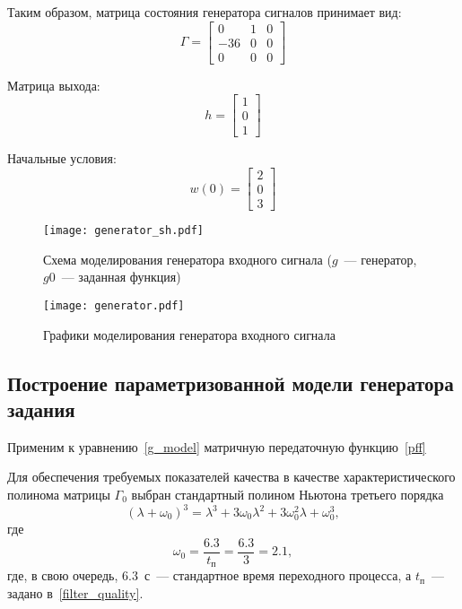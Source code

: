 Таким образом, матрица состояния генератора сигналов принимает вид:
\begin{equation}
	\Gamma = 
	\begin{bmatrix}
		0 & 1 & 0 \\
		-36 & 0 & 0 \\
		0 & 0 & 0
	\end{bmatrix}
\end{equation}

Матрица выхода:
\begin{equation}
	h = 
	\begin{bmatrix}
		1\\ 
		0\\
		1
	\end{bmatrix}
\end{equation}

Начальные условия:
\begin{equation}
	w(0) = 
	\begin{bmatrix}
		2\\
		0\\
		3
	\end{bmatrix}
\end{equation}

\begin{figure}[h!]
	\centering
	\texttt{[image: generator\_sh.pdf]}
	\caption{Схема моделирования генератора входного сигнала ($g$~--- генератор, $g0$~--- заданная функция)}
	\label{fg:generator_sh}
\end{figure}

\begin{figure}[h!]
	\centering
	\texttt{[image: generator.pdf]}
	\caption{Графики моделирования генератора входного сигнала}
	\label{fg:generator}
\end{figure}

\clearpage
\subsection{Построение параметризованной модели генератора задания}

Применим к уравнению~\eqref{g_model} матричную передаточную функцию~\eqref{pff}

Для обеспечения требуемых показателей качества в качестве характеристического полинома матрицы $\Gamma_0$ выбран стандартный полином Ньютона третьего порядка
\begin{equation}
(\lambda + \omega_0)^3 = \lambda^3 +  3 \omega_0 \lambda^2 + 3 \omega_0^2 \lambda + \omega_0^3,
\end{equation}
где
\begin{equation}
\omega_0 = \frac{6.3}{t_\text{п}} = \frac{6.3}{3} = 2.1,
\end{equation}
где, в свою очередь, $6.3$~с~--- стандартное время переходного процесса, а $t_\text{п}$~--- задано в~\eqref{filter_quality}.


